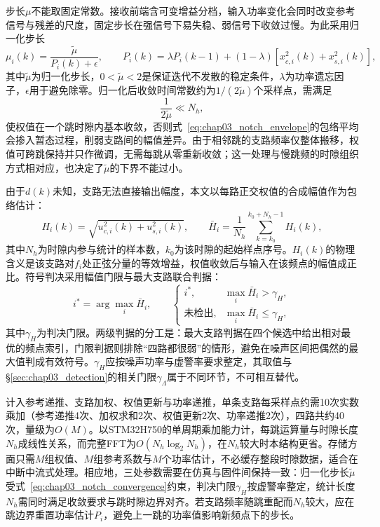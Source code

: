 步长$\mu$不能取固定常数。接收前端含可变增益分档，输入功率变化会同时改变参考信号与残差的尺度，固定步长在强信号下易失稳、弱信号下收敛过慢。为此采用归一化步长
\begin{equation}
\mu_i(k)=\frac{\tilde\mu}{P_i(k)+\epsilon},\qquad
P_i(k)=\lambda P_i(k-1)+(1-\lambda)\left[x_{c,i}^{2}(k)+x_{s,i}^{2}(k)\right],
\label{eq:chap03_lms_norm}
\end{equation}
其中$\tilde\mu$为归一化步长，$0<\tilde\mu<2$是保证迭代不发散的稳定条件，$\lambda$为功率遗忘因子，$\epsilon$用于避免除零。归一化后收敛时间常数约为$1/(2\tilde\mu)$个采样点，需满足
\begin{equation}
\frac{1}{2\tilde\mu}\ll N_h,
\label{eq:chap03_notch_convergence}
\end{equation}
使权值在一个跳时隙内基本收敛，否则式~\eqref{eq:chap03_notch_envelope}的包络平均会掺入暂态过程，削弱支路间的幅值差异。由于相邻跳的支路频率仅整体搬移，权值可跨跳保持并只作微调，无需每跳从零重新收敛；这一处理与慢跳频的时隙组织方式相对应，也决定了$\tilde\mu$的下界不能过小。

由于$d(k)$未知，支路无法直接输出幅度，本文以每路正交权值的合成幅值作为包络估计：
\begin{equation}
H_i(k)=\sqrt{u_{c,i}^{2}(k)+u_{s,i}^{2}(k)},\qquad
\bar H_i=\frac{1}{N_h}\sum_{k=k_0}^{k_0+N_h-1}H_i(k),
\label{eq:chap03_notch_envelope}
\end{equation}
其中$N_h$为时隙内参与统计的样本数，$k_0$为该时隙的起始样点序号。$H_i(k)$的物理含义是该支路对$f_i$处正弦分量的等效增益，权值收敛后与输入在该频点的幅值成正比。符号判决采用幅值门限与最大支路联合判据：
\begin{equation}
i^{*}=\arg\max_i\bar H_i,\qquad
\begin{cases}
i^{*}, & \max_i\bar H_i>\gamma_H,\\
\text{未检出}, & \max_i\bar H_i\le\gamma_H,
\end{cases}
\label{eq:chap03_notch_decision}
\end{equation}
其中$\gamma_H$为判决门限。两级判据的分工是：最大支路判据在四个候选中给出相对最优的频点索引，门限判据则排除“四路都很弱”的情形，避免在噪声区间把偶然的最大值判成有效符号。$\gamma_H$应按噪声功率与虚警率要求整定，其取值与\S\ref{sec:chap03_detection}的相关门限$\gamma_\Lambda$属于不同环节，不可相互替代。

计入参考递推、支路加权、权值更新与功率递推，单条支路每采样点约需10次实数乘加（参考递推4次、加权求和2次、权值更新2次、功率递推2次），四路共约40次，量级为$O(M)$。以STM32H750的单周期乘加能力计，每跳运算量与时隙长度$N_h$成线性关系，而完整FFT为$O(N_h\log_2 N_h)$，在$N_h$较大时本结构更省。存储方面只需$M$组权值、$M$组参考系数与$M$个功率估计，不必缓存整段时隙数据，适合在中断中流式处理。相应地，三处参数需要在仿真与固件间保持一致：归一化步长$\tilde\mu$受式~\eqref{eq:chap03_notch_convergence}约束，判决门限$\gamma_H$按虚警率整定，统计长度$N_h$需同时满足收敛要求与跳时隙边界对齐。若支路频率随跳重配而$N_h$较大，应在跳边界重置功率估计$P_i$，避免上一跳的功率值影响新频点下的步长。

